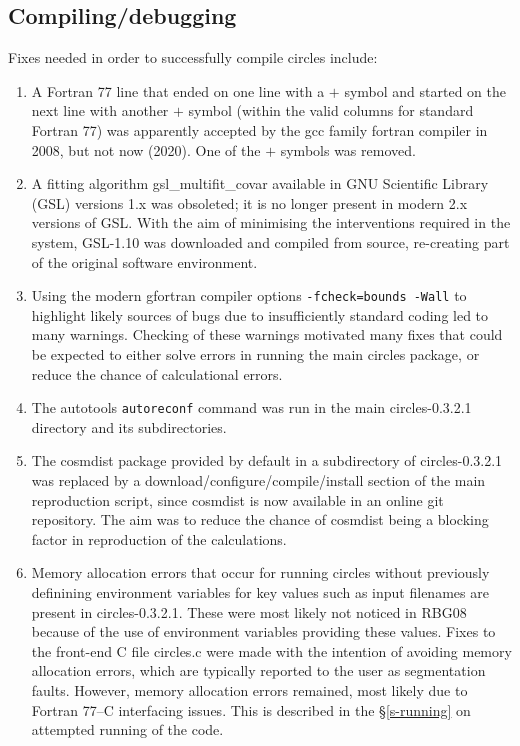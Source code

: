 \subsection{Compiling/debugging}

Fixes needed in order to successfully compile {\sc circles} include:
\begin{enumerate}
\item
  A Fortran 77 line that ended on one line with a $+$ symbol and
  started on the next line with another $+$ symbol (within the valid
  columns for standard Fortran 77) was apparently accepted by the {\sc
    gcc} family fortran compiler in 2008, but not now (2020). One of
  the $+$ symbols was removed.
\item
  A fitting algorithm {\sc gsl\_multifit\_covar} available in GNU
  Scientific Library ({\sc GSL}) versions 1.x was obsoleted; it is no
  longer present in modern 2.x versions of {\sc GSL}. With the aim of
  minimising the interventions required in the system, {\sc
    GSL-1.10} was downloaded and compiled from source, re-creating
  part of the original software environment.
\item
  Using the modern {\sc gfortran} compiler options {\tt -fcheck=bounds
    -Wall} to highlight likely sources of bugs due to insufficiently
  standard coding led to many warnings.  Checking of these warnings
  motivated many fixes that could be expected to either solve errors
  in running the main {\sc circles} package, or reduce the chance of
  calculational errors.
\item
  The autotools {\tt autoreconf} command was run in the main {\sc
    circles-0.3.2.1} directory and its subdirectories.
\item
  The {\sc cosmdist} package provided by default in a subdirectory of
  {\sc circles-0.3.2.1} was replaced by a
  download/configure/compile/install section of the main reproduction
  script, since {\sc cosmdist} is now available in an online
  git repository. The aim was to reduce the chance of {\sc cosmdist}
  being a blocking factor in reproduction of the calculations.
\item
  Memory allocation errors that occur for running {\sc circles}
  without previously definining environment variables for key
  values such as input filenames are present in {\sc
    circles-0.3.2.1}. These were most likely not noticed in RBG08
  because of the use of environment variables providing these
  values. Fixes to the front-end C file {\sc circles.c} were
  made with the intention of avoiding memory allocation errors,
  which are typically reported to the user as segmentation faults.
  However, memory allocation errors remained, most likely due
  to Fortran 77--C interfacing issues. This is described in the
  \S\ref{s-running} on attempted running of the code.
\end{enumerate}

